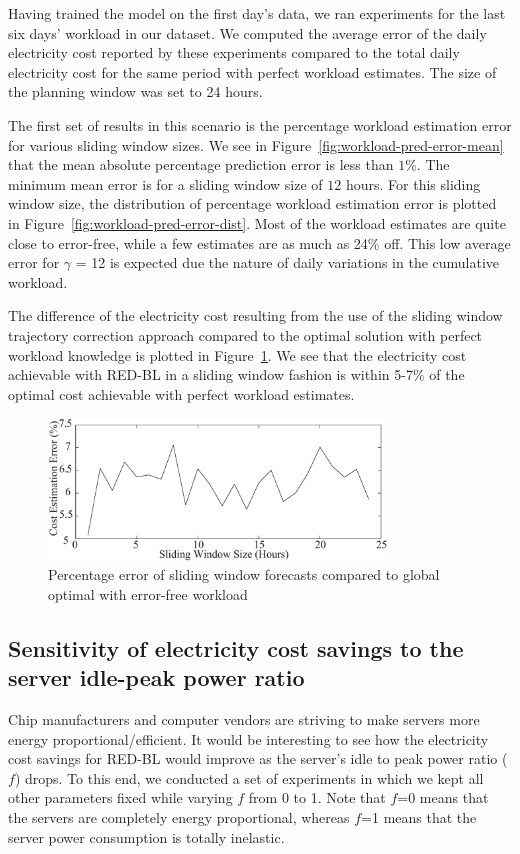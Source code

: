Having trained the model on the first day's data, we ran experiments for the last six days' workload in our dataset. We computed the average error of the daily electricity cost reported by these experiments compared to the total daily electricity cost for the same period with perfect workload estimates. The size of the planning window was set to 24 hours. 

The first set of results in this scenario is the percentage workload estimation error for various sliding window sizes. We see in Figure~\ref{fig:workload-pred-error-mean} that the mean absolute percentage prediction error is less than $1\%$. The minimum mean error is for a sliding window size of $12$ hours. For this sliding window size, the distribution of percentage workload estimation error is plotted in Figure~\ref{fig:workload-pred-error-dist}. Most of the workload estimates are quite close to error-free, while a few estimates are as much as 24$\%$ off. This low average error for $\gamma$ = 12 is expected due the nature of daily variations in the cumulative workload.

The difference of the electricity cost resulting from the use of the sliding window trajectory correction approach compared to the optimal solution with perfect workload knowledge is plotted in Figure~\ref{fig:s5r}. We see that the electricity cost achievable with RED-BL in a sliding window fashion is within 5-7$\%$ of the optimal cost achievable with perfect workload estimates. 

\begin{figure}[htbp]
    \centering
    \includegraphics[width=0.8\textwidth]{pics/sw-cost-error-2.eps}
\caption{Percentage error of sliding window forecasts compared to global optimal with error-free workload}
\label{fig:s5r}
\end{figure}



\subsection{Sensitivity of electricity cost savings to the server idle-peak power ratio}
Chip manufacturers and computer vendors are striving to make servers more energy proportional/efficient. It would be interesting to see how the electricity cost savings for RED-BL would improve as the server's idle to peak power ratio ($f$) drops. To this end, we conducted a set of experiments in which we kept all other parameters fixed while varying $f$ from 0 to 1.  Note that $f$=0 means that the servers are completely energy proportional, whereas $f$=1 means that the server power consumption is totally inelastic.

